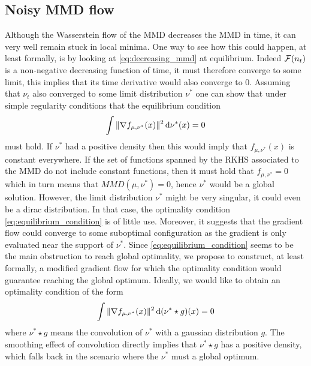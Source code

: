 

\subsection{Noisy MMD flow}

Although the Wasserstein flow of the MMD decreases the MMD in time, it can very well remain stuck in local minima. One way to see how this could happen, at least formally, is by looking at \cref{eq:decreasing_mmd} at equilibrium. Indeed ${{\mathcal F}}(n_t)$ is a non-negative decreasing function of time, it must therefore converge to some limit, this implies that its time derivative would also converge to $0$. Assuming that $\nu_t$ also converged to some limit distribution $\nu^{*}$ one can show that under simple regularity conditions that the equilibrium condition
\begin{align}\label{eq:equilibrium_condition}
	\int \Vert \nabla f_{\mu,\nu^{*}}(x)\Vert^2 \mathop{}\!\mathrm{d} \nu^{*}(x) =0  
\end{align} 
must hold. If $\nu^*$ had a positive density then this would imply that $f_{\mu,\nu^{*}}(x)$ is constant everywhere. If the set of functions spanned by the RKHS associated to the MMD do not include constant functions, then it must hold that $f_{\mu,\nu^{*}}=0$ which in turn means that $MMD(\mu,\nu^{*})=0$, hence $\nu^*$ would be a global solution. However, the limit distribution $\nu^*$  might be very singular, it could even be a dirac distribution. In that case, the optimality condition \cref{eq:equilibrium_condition} is of little use. Moreover, it suggests that the gradient flow could converge to some suboptimal configuration as the gradient is only evaluated near the support of $\nu^*$.
Since \cref{eq:equilibrium_condition} seems to be the main obstruction to reach global optimality, we propose to construct, at least formally, a modified gradient flow for which the optimality condition would guarantee reaching the global optimum.
Ideally, we would like to obtain an optimality condition of the form
\begin{align}\label{eq:soothed_equilibrium_condition}
	\int \Vert \nabla f_{\mu,\nu^{*}}(x)\Vert^2 \mathop{}\!\mathrm{d} (\nu^{*}\star g)(x) =0  
\end{align}
where $\nu^{*}\star g$ means the convolution of $\nu^*$ with a gaussian distribution $g$. The smoothing effect of convolution directly implies that $\nu^{*}\star g$ has a positive density, which falls back in the scenario where the $\nu^*$ must a global optimum.
